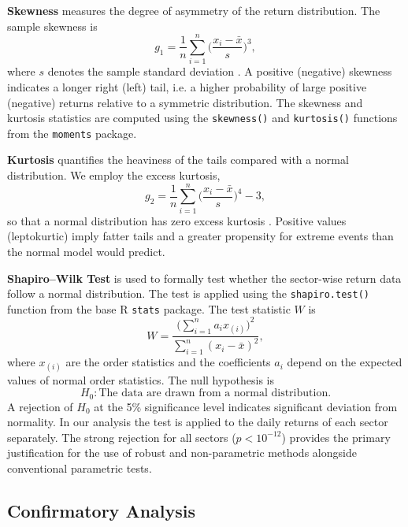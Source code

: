 \documentclass[12pt,a4paper,fleqn]{article}
\begin{document}
\textbf{Skewness} measures the degree of asymmetry of the return distribution. The sample skewness is
\begin{equation}
g_1 = \frac{1}{n}\sum_{i=1}^{n}\Big(\frac{x_i - \bar{x}}{s}\Big)^3,
\label{eq:skewness}
\end{equation}
where \(s\) denotes the sample standard deviation \cite{joanes1998comparing}. A positive (negative) skewness indicates a longer right (left) tail, i.e. a higher probability of large positive (negative) returns relative to a symmetric distribution. The skewness and kurtosis statistics are computed using the \texttt{skewness()} and \texttt{kurtosis()} functions from the \texttt{moments} package.

\textbf{Kurtosis} quantifies the heaviness of the tails compared with a normal distribution. We employ the excess kurtosis,
\begin{equation}
g_2 = \frac{1}{n}\sum_{i=1}^{n}\Big(\frac{x_i - \bar{x}}{s}\Big)^4 - 3,
\label{eq:kurtosis}
\end{equation}
so that a normal distribution has zero excess kurtosis \cite{de1992tests}. Positive values (leptokurtic) imply fatter tails and a greater propensity for extreme events than the normal model would predict.

\textbf{Shapiro–Wilk Test} \cite{shapiro1965variance} is used to formally test whether the sector-wise return data follow a normal distribution. The test is applied using the \texttt{shapiro.test()} function from the base R \texttt{stats} package. The test statistic \(W\) is
\begin{equation}
W = \frac{\big(\sum_{i=1}^{n} a_i x_{(i)}\big)^2}{\sum_{i=1}^{n} (x_i - \bar{x})^2},
\label{eq:shapiro}
\end{equation}
where \(x_{(i)}\) are the order statistics and the coefficients \(a_i\) depend on the expected values of normal order statistics. The null hypothesis is
\[
H_0: \text{The data are drawn from a normal distribution.}
\]
A rejection of \(H_0\) at the 5\% significance level indicates significant deviation from normality. In our analysis the test is applied to the daily returns of each sector separately. The strong rejection for all sectors (\(p<10^{-12}\)) provides the primary justification for the use of robust and non-parametric methods alongside conventional parametric tests.

\subsection{Confirmatory Analysis}
\end{document}
